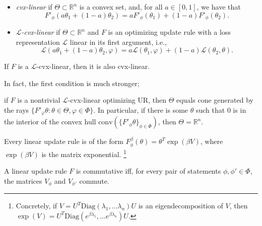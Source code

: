 \begin{subappendices}
\begin{defn}
\begin{itemize}
    \item \emph{cvx-linear} if $\Theta \subset \mathbb R^n$ is a convex set, and, for all $a \in [0,1]$, we have that
    \[ F'_\phi(a \theta_1 + (1-a) \theta_2) = a F'_\phi(\theta_1) + (1-a) F'_\phi(\theta_2). \]

    \item \emph{$\mathcal L$-cvx-linear} if $\Theta \subset \mathbb R^n$ and $F$ is an optimizing update rule with a loss representation $\mathcal L$ linear in its first argument, i.e.,
    \[
        \mathcal L(a \theta_1 + (1-a) \theta_2, \varphi) = a \mathcal L(\theta_1, \varphi) + (1-a) \mathcal L(\theta_2, \theta).
    \]
    \end{itemize}
    \end{defn}

    \begin{prop}
    If $F$ is a $\mathcal L$-cvx-linear, then it is also cvx-linear.
    \end{prop}

    In fact, the first condition is much stronger;
    \begin{prop}
    if $F$ is a nontrivial $\mathcal L$-cvx-linear optimizing UR, then $\Theta$ equals cone generated by  the rays $\{ F'_\varphi\theta : \theta \in \Theta, \varphi \in \Phi \}$. In particular, if there is some $\theta$ such that $0$ is in the interior of the convex hull $\mathrm{conv}(\{F'_\phi\theta\}_{\phi \in \Phi})$, then $\Theta = \mathbb R^n$.
    \end{prop}


    \begin{prop}
    Every linear update rule is of the form
    $
        F^{\beta}_\phi(\theta) =  \theta^{T} \exp(\beta V)
    $,
    where $\exp(\beta V)$ is the matrix exponential.%
        \footnote{Concretely, if $V = U^T \mathrm{Diag}(\lambda_1, \ldots \lambda_n) U$ is an eigendecomposition of $V$, then $\exp(V) = U^T \mathrm{Diag}(e^{\beta\lambda_1}, \ldots e^{\beta\lambda_n}) U$.}
    \end{prop}

    \begin{prop}
    A linear update rule $F$ is commutative iff, for every pair of statements  $\phi, \phi' \in \Phi$, the
    matrices $V_\phi$ and $V_{\phi'}$ commute.
    \end{prop}





\end{subappendices}
